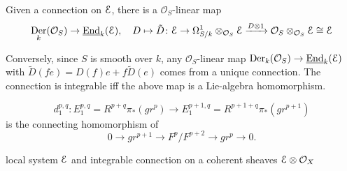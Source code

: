 \documentclass[leqno]{amsart}
\newcommand{\EE}{\EuScript{E}}
\newcommand{\oo}{\mathcal O}
\newcommand{\1}{\mathbf{1}}
\DeclareMathOperator{\Der}{Der}
\DeclareMathOperator{\End}{End}
\theoremstyle{definition}
\theoremstyle{remark}
\begin{document}
Given a connection on $\EE$,
there is a  $\oo_S$-linear map
 \[
	 \Der_k(\oo_S)\to \underline{\End}_k(\EE),\quad
	 D\mapsto
	 \tilde{D}\colon 
	 \EE\to \Omega_{S/k}^1\otimes_{\oo_S}\EE
	 \xrightarrow{D\otimes 1}
	 \oo_S\otimes_{\oo_S}\EE\cong \EE
\]

Conversely, since $S$ is smooth over  $k$,
any  $\oo_S$-linear map
$\Der_k(\oo_S)\to \underline{\End}_k(\EE)$
with  $ \tilde{D}(fe)=D(f)e+f\tilde{D}(e)$
comes from a unique connection.
The connection is integrable iff
the above map is a Lie-algebra homomorphism.

 \[
	 d_1^{p,q}\colon E_1^{p,q}=R^{p+q}\pi_*(gr^p)\to 
	 E_1^{p+1,q}=R^{p+1+q}\pi_*(gr^{p+1})
\]
is the connecting homomorphism of 
\[
	0\to gr^{p+1}\to F^p/F^{p+2}\to gr^p\to 0.
\]

local system $\EE$ and 
integrable connection on a coherent sheaves $\EE\otimes\oo_X$

%
%
\end{document}
